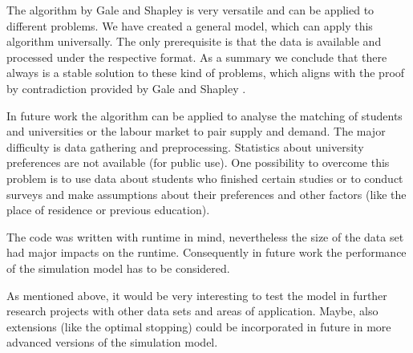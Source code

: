 \label{summary}
The algorithm by Gale and Shapley is very versatile and can be applied to different problems.
We have created a general model, which can apply this algorithm universally.
The only prerequisite is that the data is available and processed under the respective format.
As a summary we conclude that there always is a stable solution to these kind of problems, which aligns with the proof by contradiction provided by Gale and Shapley \cite{gale62a}. 

In future work the algorithm can be applied to analyse the matching of students and universities or the labour market to pair supply and demand.
The major difficulty is data gathering and preprocessing. 
Statistics about university preferences are not available (for public use).
One possibility to overcome this problem is to use data about students who finished certain studies or to conduct surveys and make assumptions about their preferences and other factors (like the place of residence or previous education).

The code was written with runtime in mind, nevertheless the size of the data set had major impacts on the runtime.
Consequently in future work the performance of the simulation model has to be considered.

As mentioned above, it would be very interesting to test the model in further research projects with other data sets and areas of application.
Maybe, also extensions (like the optimal stopping) could be incorporated in future in more advanced versions of the simulation model.
